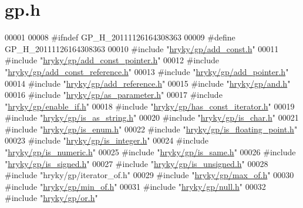\hypertarget{gp_8h_source}{\section{gp.\-h}
}

\begin{DoxyCode}
00001 
00008 \textcolor{preprocessor}{#ifndef GP\_H\_20111126164308363}
00009 \textcolor{preprocessor}{}\textcolor{preprocessor}{#define GP\_H\_20111126164308363}
00010 \textcolor{preprocessor}{}\textcolor{preprocessor}{#include "\hyperlink{add__const_8h}{hryky/gp/add_const.h}"}
00011 \textcolor{preprocessor}{#include "\hyperlink{add__const__pointer_8h}{hryky/gp/add_const_pointer.h}"}
00012 \textcolor{preprocessor}{#include "\hyperlink{add__const__reference_8h}{hryky/gp/add_const_reference.h}"}
00013 \textcolor{preprocessor}{#include "\hyperlink{add__pointer_8h}{hryky/gp/add_pointer.h}"}
00014 \textcolor{preprocessor}{#include "\hyperlink{add__reference_8h}{hryky/gp/add_reference.h}"}
00015 \textcolor{preprocessor}{#include "\hyperlink{and_8h}{hryky/gp/and.h}"}
00016 \textcolor{preprocessor}{#include "\hyperlink{as__parameter_8h}{hryky/gp/as_parameter.h}"}
00017 \textcolor{preprocessor}{#include "\hyperlink{enable__if_8h}{hryky/gp/enable_if.h}"}
00018 \textcolor{preprocessor}{#include "\hyperlink{has__const__iterator_8h}{hryky/gp/has_const_iterator.h}"}
00019 \textcolor{preprocessor}{#include "\hyperlink{is__as__string_8h}{hryky/gp/is_as_string.h}"}
00020 \textcolor{preprocessor}{#include "\hyperlink{is__char_8h}{hryky/gp/is_char.h}"}
00021 \textcolor{preprocessor}{#include "\hyperlink{is__enum_8h}{hryky/gp/is_enum.h}"}
00022 \textcolor{preprocessor}{#include "\hyperlink{is__floating__point_8h}{hryky/gp/is_floating_point.h}"}
00023 \textcolor{preprocessor}{#include "\hyperlink{is__integer_8h}{hryky/gp/is_integer.h}"}
00024 \textcolor{preprocessor}{#include "\hyperlink{is__numeric_8h}{hryky/gp/is_numeric.h}"}
00025 \textcolor{preprocessor}{#include "\hyperlink{is__same_8h}{hryky/gp/is_same.h}"}
00026 \textcolor{preprocessor}{#include "\hyperlink{is__signed_8h}{hryky/gp/is_signed.h}"}
00027 \textcolor{preprocessor}{#include "\hyperlink{is__unsigned_8h}{hryky/gp/is_unsigned.h}"}
00028 \textcolor{preprocessor}{#include "hryky/gp/iterator\_of.h"}
00029 \textcolor{preprocessor}{#include "\hyperlink{max__of_8h}{hryky/gp/max_of.h}"}
00030 \textcolor{preprocessor}{#include "\hyperlink{min__of_8h}{hryky/gp/min_of.h}"}
00031 \textcolor{preprocessor}{#include "\hyperlink{null_8h}{hryky/gp/null.h}"}
00032 \textcolor{preprocessor}{#include "\hyperlink{or_8h}{hryky/gp/or.h}"}

\end{DoxyCode}
